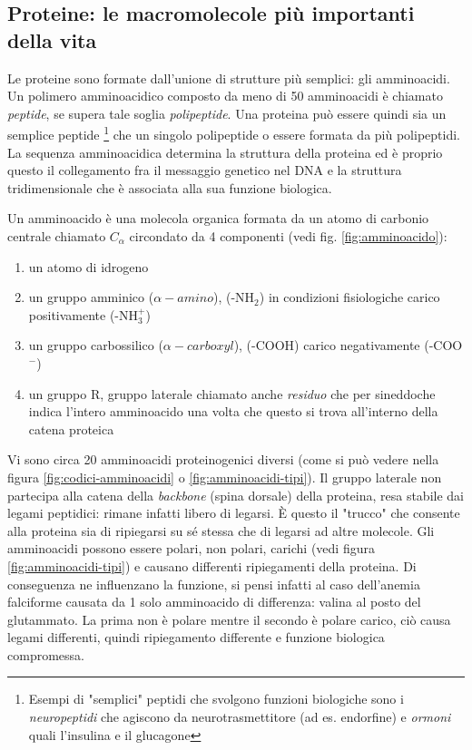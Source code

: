\subsection{Proteine: le macromolecole più importanti della vita}

Le proteine sono formate dall'unione di strutture più semplici: gli amminoacidi. Un polimero amminoacidico composto da meno di 50 amminoacidi è chiamato \textit{peptide}, se supera tale soglia \textit{polipeptide}. Una proteina può essere quindi sia un semplice peptide \footnote{Esempi di "semplici" peptidi che svolgono funzioni biologiche sono i \textit{neuropeptidi} che agiscono da neurotrasmettitore (ad es. endorfine) e \textit{ormoni} quali l'insulina e il glucagone} che un singolo polipeptide o essere formata da più polipeptidi. La sequenza amminoacidica determina la struttura della proteina ed è proprio questo il collegamento fra il messaggio genetico nel DNA e la struttura tridimensionale che è associata alla sua funzione biologica. 

\par Un amminoacido è una molecola organica formata da un atomo di carbonio centrale chiamato $C_{\alpha}$ circondato da 4 componenti (vedi fig. \ref{fig:amminoacido}):
\begin{enumerate}
	\item un atomo di idrogeno
	\item un gruppo amminico ($\alpha-amino$), (-NH$_{2}$) in condizioni fisiologiche carico positivamente (-NH$_{3}^{+}$) 
	\item un gruppo carbossilico ($\alpha-carboxyl$), (-COOH) carico negativamente (-COO$^{-}$)
	\item un gruppo R, gruppo laterale chiamato anche \textit{residuo} che per sineddoche indica l'intero amminoacido una volta che questo si trova all'interno della catena proteica
\end{enumerate}

Vi sono circa 20 amminoacidi proteinogenici diversi (come si può vedere nella figura \ref{fig:codici-amminoacidi} o \ref{fig:amminoacidi-tipi}). Il gruppo laterale non partecipa alla catena della \textit{backbone} (spina dorsale) della proteina, resa stabile dai legami peptidici: rimane infatti libero di legarsi. È questo il "trucco" che consente alla proteina sia di ripiegarsi su sé stessa che di legarsi ad altre molecole. Gli amminoacidi possono essere polari, non polari, carichi (vedi figura \ref{fig:amminoacidi-tipi}) e causano differenti ripiegamenti della proteina. Di conseguenza ne influenzano la funzione, si pensi infatti al caso dell'anemia falciforme causata da 1 solo amminoacido di differenza: valina al posto del glutammato. La prima non è polare mentre il secondo è polare carico, ciò causa legami differenti, quindi ripiegamento differente e funzione biologica compromessa. 

